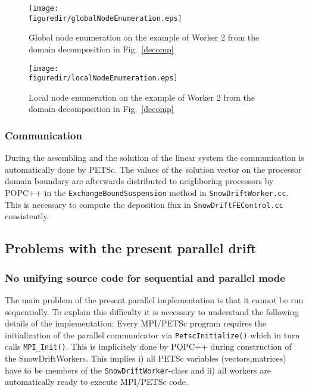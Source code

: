 \documentclass[12pt]{report}
\def\figuredir{./figures}
\begin{document}
\begin{figure}[t]
  \begin{minipage}[c]{0.48\textwidth}
      \texttt{[image: \\figuredir/globalNodeEnumeration.eps]}
      \caption{Global node enumeration on the example of Worker 2 from
        the domain decomposition in Fig.\ \ref{decomp}}
    \label{globalNode}
  \end{minipage}
  \hfill
  \begin{minipage}[c]{0.48\textwidth}
    \texttt{[image: \\figuredir/localNodeEnumeration.eps]}
    \caption{Local node enumeration on the example of Worker 2 from
      the domain decomposition in Fig.\ \ref{decomp}}
    \label{localNode}
  \end{minipage}
\end{figure}


\subsubsection{Communication}
During the assembling and the solution of the linear system the
communication is automatically done by PETSc. The values of the
solution vector on the processor domain boundary are afterwards
distributed to neighboring processors by POPC++ in the
\verb+ExchangeBoundSuspension+ method in \verb+SnowDriftWorker.cc+.
This is necessary to compute the deposition flux in
\verb+SnowDriftFEControl.cc+ consistently.


\subsection{Problems with the present parallel drift}

\subsubsection{No unifying source code for sequential and parallel mode}
The main problem of the present parallel implementation is that it
cannot be run sequentially. To explain this difficulty it is necessary
to understand the following details of the implementation: Every
MPI/PETSc program requires the initialization of the parallel
communicator via \verb+PetscInitialize()+ which in turn calls
\verb+MPI_Init()+. This is implicitely done by POPC++ during
construction of the SnowDriftWorkers. This implies i) all PETSc
variables (vectors,matrices) have to be members of the
\verb+SnowDriftWorker+-class and ii) all workers are automatically
ready to execute MPI/PETSc code.
\end{document}
